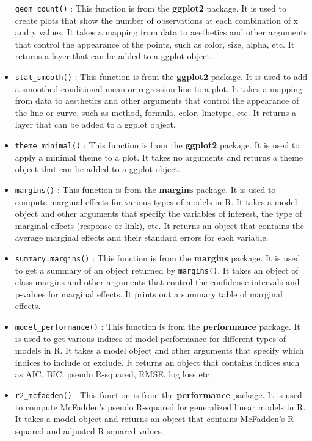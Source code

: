 \documentclass[
]{book}
\begin{document}
\begin{itemize}
  \texttt{geom\_count()} : This function is from the \textbf{ggplot2} package. It is used to create plots that show the number of observations at each combination of x and y values. It takes a mapping from data to aesthetics and other arguments that control the appearance of the points, such as color, size, alpha, etc. It returns a layer that can be added to a ggplot object.
\item
  \texttt{stat\_smooth()} : This function is from the \textbf{ggplot2} package. It is used to add a smoothed conditional mean or regression line to a plot. It takes a mapping from data to aesthetics and other arguments that control the appearance of the line or curve, such as method, formula, color, linetype, etc. It returns a layer that can be added to a ggplot object.
\item
  \texttt{theme\_minimal()} : This function is from the \textbf{ggplot2} package. It is used to apply a minimal theme to a plot. It takes no arguments and returns a theme object that can be added to a ggplot object.
\item
  \texttt{margins()} : This function is from the \textbf{margins} package. It is used to compute marginal effects for various types of models in R. It takes a model object and other arguments that specify the variables of interest, the type of marginal effects (response or link), etc. It returns an object that contains the average marginal effects and their standard errors for each variable.
\item
  \texttt{summary.margins()} : This function is from the \textbf{margins} package. It is used to get a summary of an object returned by \texttt{margins()}. It takes an object of class margins and other arguments that control the confidence intervals and p-values for marginal effects. It prints out a summary table of marginal effects.
\item
  \texttt{model\_performance()} : This function is from the \textbf{performance} package. It is used to get various indices of model performance for different types of models in R. It takes a model object and other arguments that specify which indices to include or exclude. It returns an object that contains indices such as AIC, BIC, pseudo R-squared, RMSE, log loss etc.
\item
  \texttt{r2\_mcfadden()} : This function is from the \textbf{performance} package. It is used to compute McFadden's pseudo R-squared for generalized linear models in R. It takes a model object and returns an object that contains McFadden's R-squared and adjusted R-squared values.

\end{itemize}
\end{document}
